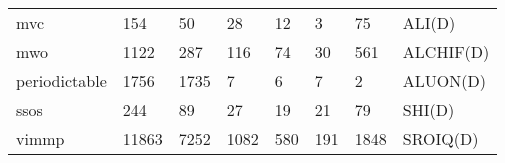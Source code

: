 \begin{table}
\begin{tabular}{m{3.5cm}|m{1cm}m{1cm}m{1cm}m{1cm}m{1cm}m{1cm}m{1cm}}
mvc                     &       154 &                50 &         28 &                   12 &                      3 &                       75 &           ALI(D) \\
mwo                     &      1122 &               287 &        116 &                   74 &                     30 &                      561 &        ALCHIF(D) \\
periodictable           &      1756 &              1735 &          7 &                    6 &                      7 &                        2 &         ALUON(D) \\
ssos                    &       244 &                89 &         27 &                   19 &                     21 &                       79 &           SHI(D) \\
vimmp                   &     11863 &              7252 &       1082 &                  580 &                    191 &                     1848 &         SROIQ(D) \\
\bottomrule
\end{tabular}
\end{table}
